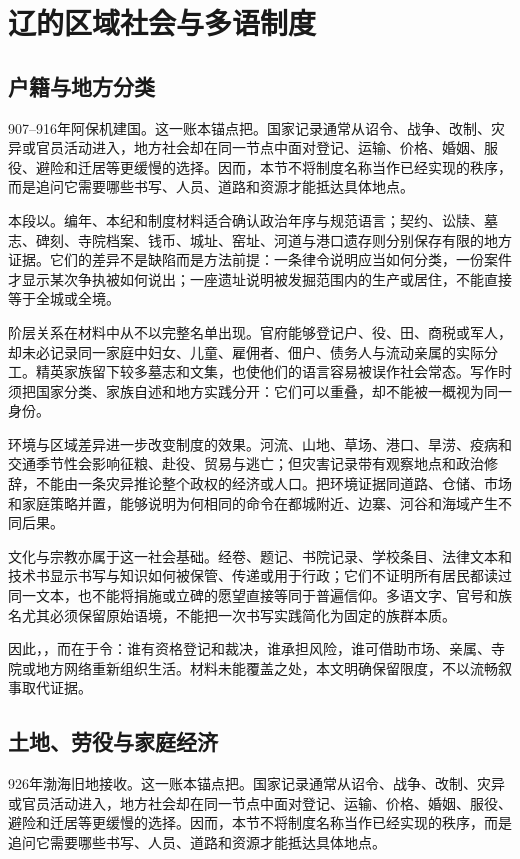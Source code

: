 \section{辽的区域社会与多语制度}

\subsection{户籍与地方分类}

907--916年阿保机建国。这一账本锚点把。国家记录通常从诏令、战争、改制、灾异或官员活动进入，地方社会却在同一节点中面对登记、运输、价格、婚姻、服役、避险和迁居等更缓慢的选择。因而，本节不将制度名称当作已经实现的秩序，而是追问它需要哪些书写、人员、道路和资源才能抵达具体地点。

本段以。编年、本纪和制度材料适合确认政治年序与规范语言；契约、讼牍、墓志、碑刻、寺院档案、钱币、城址、窑址、河道与港口遗存则分别保存有限的地方证据。它们的差异不是缺陷而是方法前提：一条律令说明应当如何分类，一份案件才显示某次争执被如何说出；一座遗址说明被发掘范围内的生产或居住，不能直接等于全城或全境。

阶层关系在材料中从不以完整名单出现。官府能够登记户、役、田、商税或军人，却未必记录同一家庭中妇女、儿童、雇佣者、佃户、债务人与流动亲属的实际分工。精英家族留下较多墓志和文集，也使他们的语言容易被误作社会常态。写作时须把国家分类、家族自述和地方实践分开：它们可以重叠，却不能被一概视为同一身份。

环境与区域差异进一步改变制度的效果。河流、山地、草场、港口、旱涝、疫病和交通季节性会影响征粮、赴役、贸易与逃亡；但灾害记录带有观察地点和政治修辞，不能由一条灾异推论整个政权的经济或人口。把环境证据同道路、仓储、市场和家庭策略并置，能够说明为何相同的命令在都城附近、边寨、河谷和海域产生不同后果。

文化与宗教亦属于这一社会基础。经卷、题记、书院记录、学校条目、法律文本和技术书显示书写与知识如何被保管、传递或用于行政；它们不证明所有居民都读过同一文本，也不能将捐施或立碑的愿望直接等同于普遍信仰。多语文字、官号和族名尤其必须保留原始语境，不能把一次书写实践简化为固定的族群本质。

因此，，而在于令：谁有资格登记和裁决，谁承担风险，谁可借助市场、亲属、寺院或地方网络重新组织生活。材料未能覆盖之处，本文明确保留限度，不以流畅叙事取代证据。

\subsection{土地、劳役与家庭经济}

926年渤海旧地接收。这一账本锚点把。国家记录通常从诏令、战争、改制、灾异或官员活动进入，地方社会却在同一节点中面对登记、运输、价格、婚姻、服役、避险和迁居等更缓慢的选择。因而，本节不将制度名称当作已经实现的秩序，而是追问它需要哪些书写、人员、道路和资源才能抵达具体地点。

